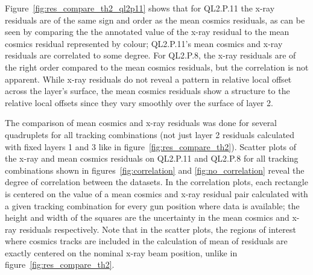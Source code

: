 Figure~\ref{fig:res_compare_th2_ql2p11} shows that for QL2.P.11 the x-ray residuals are of the same sign and order as the mean cosmics residuals, as can be seen by comparing the the annotated value of the x-ray residual to the mean cosmics residual represented by colour; QL2.P.11's mean cosmics and x-ray residuals are correlated to some degree. For QL2.P.8, the x-ray residuals are of the right order compared to the mean cosmics residuals, but the correlation is not apparent. While x-ray residuals do not reveal a pattern in relative local offset across the layer's surface, the mean cosmics residuals show a structure to the relative local offsets since they vary smoothly over the surface of layer 2. 

The comparison of mean cosmics and x-ray residuals was done for several quadruplets for all tracking combinations (not just layer 2 residuals calculated with fixed layers 1 and 3 like in figure~\ref{fig:res_compare_th2}). Scatter plots of the x-ray and mean cosmics residuals on QL2.P.11 and QL2.P.8 for all tracking combinations shown in figures~\ref{fig:correlation} and \ref{fig:no_correlation} reveal the degree of correlation between the datasets. In the correlation plots, each rectangle is centered on the value of a mean cosmics and x-ray residual pair calculated with a given tracking combination for every gun position where data is available; the height and width of the squares are the uncertainty in the mean cosmics and x-ray residuals respectively. Note that in the scatter plots, the regions of interest where cosmics tracks are included in the calculation of mean of residuals are exactly centered on the nominal x-ray beam position, unlike in figure~\ref{fig:res_compare_th2}.

